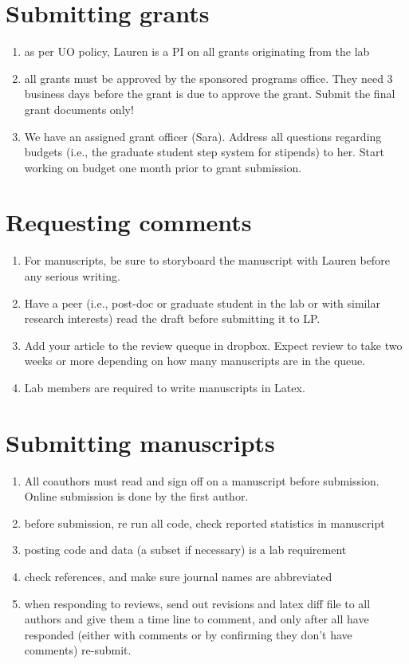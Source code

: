 \documentclass[12pt]{article}
\begin{document}
\section{Submitting grants}
\begin{enumerate}
\item as per UO policy, Lauren is a PI on all grants originating from
  the lab
\item all grants must be approved by the sponsored programs
  office. They need 3 business days before the grant is due to
  approve the grant. Submit the final grant documents only!
\item We have an assigned grant officer (Sara).  Address all questions
  regarding budgets (i.e., the graduate student step system for
  stipends) to her. Start working on budget one month prior to grant
  submission.
\end{enumerate}

\section{Requesting comments}
\begin{enumerate}
\item For manuscripts, be sure to storyboard the manuscript with
  Lauren before any serious writing.
\item Have a peer (i.e., post-doc or graduate student in the lab or
  with similar research interests) read the draft before submitting it
  to LP.
\item Add your article to the review queque in dropbox. Expect review
  to take two weeks or more depending on how many manuscripts are in
  the queue.
\item Lab members are required to write manuscripts in Latex.
\end{enumerate}

\section{Submitting manuscripts}
\begin{enumerate}
\item All coauthors must read and sign off on a manuscript before
  submission. Online submission is done by the first author.
\item before submission, re run all code, check reported statistics in
  manuscript
\item posting code and data (a subset if necessary) is a lab
  requirement
\item check references, and make sure journal names are abbreviated
\item when responding to reviews, send out revisions and latex diff
  file to all authors and give them a time line to comment, and only
  after all have responded (either with comments or by confirming they
  don't have comments) re-submit.
\end{enumerate}
\end{document}
